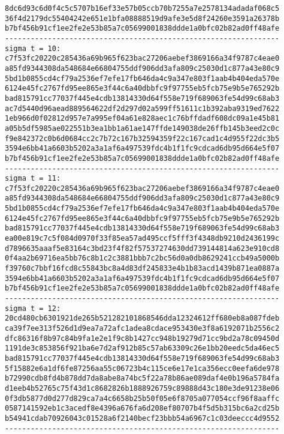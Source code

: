 \documentclass{article}
\begin{document}
{\begin{verbatim}
8dc6d93c6d0f4c5c5707b16ef33e57b05ccb70b7255a7e2578134adadaf068c5
36f4d2179dc55404242e651e1bfa08888519d9afe3e5d8f24260e3591a26378b
b7bf456b91cf1ee2fe2e53b85a7c05699001838ddde1a0bfc02b82ad0ff48afe
----------------------------------------------------------------
sigma t = 10:
c7f53fc20220c285436a69b965f623bac27206aebef3869166a34f9787c4eae0
a85fd9344308da548684e66804755ddf906dd3afa809c25030d1c877a43e80c9
5bd1b0855cd4cf79a2536ef7efe17fb646da4c9a347e803f1aab4b404eda570e
6124e45fc2767fd95ee865e3f44c6a40dbbfc9f97755eb5fcb75e9b5e765292b
bad815791cc77037f445e4cdb13814330d64f558e719f689063fe54d99c68ab3
ac7d5440d96aead889564622df2d297d02a599ff51611c1b392aba9319ed7622
1eb966d0f02812d957e7a995ef04a61e828aec1c76bffdadf608dc09a1e45b81
a05b5df5985ae022551b3ea1bb1a61ae147ffde149038de26ffb145b3eed2c0c
f9e842372c0b6d0684cc2c7b72c167b32594359f22c167cad1c4d955f22dc3b5
3594e6bb41a6603b5202a3a1af6a497539fdc4b1f1fc9cdcad6db95d664e5f07
b7bf456b91cf1ee2fe2e53b85a7c05699001838ddde1a0bfc02b82ad0ff48afe
----------------------------------------------------------------
sigma t = 11:
c7f53fc20220c285436a69b965f623bac27206aebef3869166a34f9787c4eae0
a85fd9344308da548684e66804755ddf906dd3afa809c25030d1c877a43e80c9
5bd1b0855cd4cf79a2536ef7efe17fb646da4c9a347e803f1aab4b404eda570e
6124e45fc2767fd95ee865e3f44c6a40dbbfc9f97755eb5fcb75e9b5e765292b
bad815791cc77037f445e4cdb13814330d64f558e719f689063fe54d99c68ab3
ea00e819c7c5f084d0970f33f85ea57ad495ccf5fff3f4348db9210d2436199c
d7896635aaaf5e83164c3bd23f4f82f57537274630dd739144814a623e910cd8
0f4aa2b69716ea5bb76c8b1c2c3881bbb7c2bc56d0a0db8629241ccb49a5000b
f39760c7bbf16fcd8c55843bc8a4d83df245833e4b1b83acd1439b871ea0887a
3594e6bb41a6603b5202a3a1af6a497539fdc4b1f1fc9cdcad6db95d664e5f07
b7bf456b91cf1ee2fe2e53b85a7c05699001838ddde1a0bfc02b82ad0ff48afe
----------------------------------------------------------------
sigma t = 12:
20cd480cb6301921de265b521282101868546dda12324612ff680eb8a087fdeb
ca39f7ee313f526d1d9ea7a72afc1adea8cdace953430e3f8a6192071b2556c2
dfc86316f8b97c84b9fa1e2e1f9c8b1427cc948b19279d71cc9bd2a78c09450d
1191de3c853856f921ba6e7d2af912b85c57ab63309c26e1bb20eedc5da46ec5
bad815791cc77037f445e4cdb13814330d64f558e719f689063fe54d99c68ab3
5f15882e6a1df6fe87256aa55c06723b4c115ce6e17e1ca356ecc0eefa6de978
b72990cdb8fd4b878dd7da8abe8a74bc5f22a78b86ae089daf4e0b196a5784fa
d1eeb4b52765c75f43d1c8682826b1888926759c89888d43c180e3de91238e06
0f3db5877d0d277d829ca7a4c6658b25b50f05e6f8705a077054ccf96f8aaffc
0587141592eb1c3acedf8e4396a676fa6d208ef80707b4f5d5b315bc6a2cd25b
b54941cdab70926043c01528a6f2140becf23bbb54a6967c1c03deeccc4d9552
----------------------------------------------------------------

\end{verbatim}}
\end{document}
